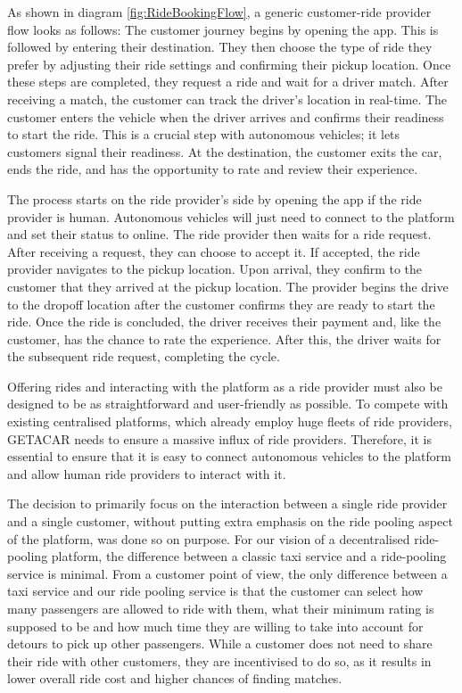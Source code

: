 As shown in diagram \ref{fig:RideBookingFlow}, a generic customer-ride provider flow looks as follows:
The customer journey begins by opening the app. This is followed by entering their destination. They then choose the type of ride they prefer by adjusting their ride settings and confirming their pickup location. Once these steps are completed, they request a ride and wait for a driver match. After receiving a match, the customer can track the driver's location in real-time. The customer enters the vehicle when the driver arrives and confirms their readiness to start the ride. This is a crucial step with autonomous vehicles; it lets customers signal their readiness. At the destination, the customer exits the car, ends the ride, and has the opportunity to rate and review their experience.

The process starts on the ride provider's side by opening the app if the ride provider is human. Autonomous vehicles will just need to connect to the platform and set their status to online. The ride provider then waits for a ride request. After receiving a request, they can choose to accept it. If accepted, the ride provider navigates to the pickup location. Upon arrival, they confirm to  the customer that they arrived at the pickup location. The provider begins the drive to the dropoff location after the customer confirms they are ready to start the ride. Once the ride is concluded, the driver receives their payment and, like the customer, has the chance to rate the experience. After this, the driver waits for the subsequent ride request, completing the cycle.

Offering rides and interacting with the platform as a ride provider must also be designed to be as straightforward and user-friendly as possible. To compete with existing centralised platforms, which already employ huge fleets of ride providers, GETACAR needs to ensure a massive influx of ride providers. Therefore, it is essential to ensure that it is easy to connect autonomous vehicles to the platform and allow human ride providers to interact with it. 

The decision to primarily focus on the interaction between a single ride provider and a single customer, without putting extra emphasis on the ride pooling aspect of the platform, was done so on purpose. For our vision of a decentralised ride-pooling platform, the difference between a classic taxi service and a ride-pooling service is minimal. From a customer point of view, the only difference between a taxi service and our ride pooling service is that the customer can select how many passengers are allowed to ride with them, what their minimum rating is supposed to be and how much time they are willing to take into account for detours to pick up other passengers. While a customer does not need to share their ride with other customers, they are incentivised to do so, as it results in lower overall ride cost and higher chances of finding matches. 

